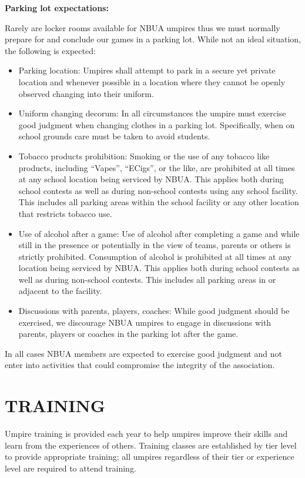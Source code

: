 \documentclass[letterpaper,11pt,colorlinks=true,allcolors=blue]{article}
\begin{document}
\begin{flushleft}\textbf{Parking lot expectations:}\end{flushleft}
Rarely are locker rooms available for NBUA umpires thus we must normally prepare for and conclude our games in a parking lot. While not an ideal situation, the following is expected:
\begin{itemize}
\item  Parking location: Umpires shall attempt to park in a secure yet private location and whenever possible in a location where they cannot be openly observed changing into their uniform.
\item  Uniform changing decorum: In all circumstances the umpire must exercise good judgment when changing clothes in a parking lot. Specifically, when on school grounds care must be taken to avoid students.
\item  Tobacco products prohibition: Smoking or the use of any tobacco like products, including “Vapes”, “ECigs”, or the like, are prohibited at all times at any school location being serviced by NBUA. This applies both during school contests as well as during non-school contests using any school facility.  This includes all parking areas within the school facility or any other location that restricts tobacco use.
\item  Use of alcohol after a game: Use of alcohol after completing a game and while still in the presence or potentially in the view of teams, parents or others is strictly prohibited. Consumption of alcohol is prohibited at all times at any location being serviced by NBUA.  This applies both during school contests as well as during non-school contests.  This includes all parking areas in or adjacent to the facility.
\item  Discussions with parents, players, coaches: While good judgment should be exercised, we discourage NBUA umpires to engage in discussions with parents, players or coaches in the parking lot after the game. 
\end{itemize}
In all cases NBUA members are expected to exercise good judgment and not enter into activities that could compromise the integrity of the association. 

\section{TRAINING}
Umpire training is provided each year to help umpires improve their skills and learn from the experiences of others. Training classes are established by tier level to provide appropriate training; all umpires regardless of their tier or experience level are required to attend training. 
\end{document}
